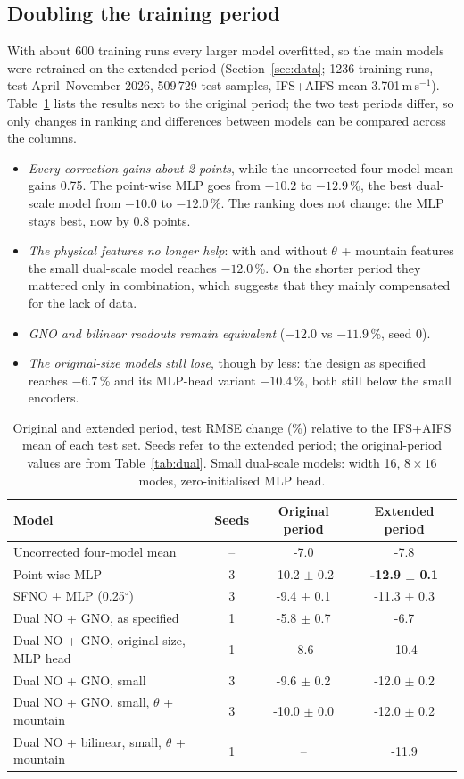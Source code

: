 \documentclass[10pt,a4paper]{article}
\begin{document}
\subsection{Doubling the training period}\label{sec:longer}
With about 600 training runs every larger model overfitted, so the main models were retrained on the
extended period (Section~\ref{sec:data}; 1236 training runs, test April--November 2026, 509\,729 test
samples, IFS+AIFS mean 3.701\,m\,s$^{-1}$). Table~\ref{tab:longer} lists the results next to the
original period; the two test periods differ, so only changes in ranking and differences between
models can be compared across the columns.
\begin{itemize}\itemsep1pt
\item \emph{Every correction gains about 2 points}, while the uncorrected four-model mean gains 0.75.
The point-wise MLP goes from $-10.2$ to $-12.9$\,\%, the best dual-scale model from $-10.0$ to
$-12.0$\,\%. The ranking does not change: the MLP stays best, now by 0.8 points.
\item \emph{The physical features no longer help}: with and without $\theta$ + mountain features the
small dual-scale model reaches $-12.0$\,\%. On the shorter period they mattered only in combination,
which suggests that they mainly compensated for the lack of data.
\item \emph{GNO and bilinear readouts remain equivalent} ($-12.0$ vs $-11.9$\,\%, seed 0).
\item \emph{The original-size models still lose}, though by less: the design as specified reaches
$-6.7$\,\% and its MLP-head variant $-10.4$\,\%, both still below the small encoders.
\end{itemize}

\begin{table}[t]
\centering\small
\caption{Original and extended period, test RMSE change (\%) relative to the IFS+AIFS mean of each test
set. Seeds refer to the extended period; the original-period values are from Table~\ref{tab:dual}.
Small dual-scale models: width 16, $8\times16$ modes, zero-initialised MLP head.}\label{tab:longer}
\begin{tabular}{@{}lccc@{}}
\toprule
Model & Seeds & Original period & Extended period\\
\midrule
Uncorrected four-model mean & -- & -7.0 & -7.8 \\
Point-wise MLP & 3 & -10.2 $\pm$ 0.2 & \textbf{-12.9 $\pm$ 0.1} \\
SFNO + MLP (0.25$^\circ$) & 3 & -9.4 $\pm$ 0.1 & -11.3 $\pm$ 0.3 \\
Dual NO + GNO, as specified & 1 & -5.8 $\pm$ 0.7 & -6.7 \\
Dual NO + GNO, original size, MLP head & 1 & -8.6 & -10.4 \\
Dual NO + GNO, small & 3 & -9.6 $\pm$ 0.2 & -12.0 $\pm$ 0.2 \\
Dual NO + GNO, small, $\theta$ + mountain & 3 & -10.0 $\pm$ 0.0 & -12.0 $\pm$ 0.2 \\
Dual NO + bilinear, small, $\theta$ + mountain & 1 & -- & -11.9 \\
\bottomrule
\end{tabular}
\end{table}
\end{document}
